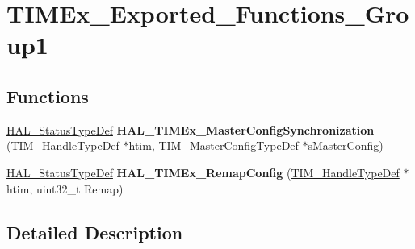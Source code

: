 \hypertarget{group___t_i_m_ex___exported___functions___group1}{\section{T\-I\-M\-Ex\-\_\-\-Exported\-\_\-\-Functions\-\_\-\-Group1}
\label{group___t_i_m_ex___exported___functions___group1}
}
\subsection*{Functions}
\begin{DoxyCompactItemize}
\item 
\hypertarget{group___t_i_m_ex___exported___functions___group1_ga056fd97d3be6c60dcfa12963f6ec8aad}{\hyperlink{stm32l1xx__hal__def_8h_a63c0679d1cb8b8c684fbb0632743478f}{H\-A\-L\-\_\-\-Status\-Type\-Def} {\bfseries H\-A\-L\-\_\-\-T\-I\-M\-Ex\-\_\-\-Master\-Config\-Synchronization} (\hyperlink{struct_t_i_m___handle_type_def}{T\-I\-M\-\_\-\-Handle\-Type\-Def} $\ast$htim, \hyperlink{struct_t_i_m___master_config_type_def}{T\-I\-M\-\_\-\-Master\-Config\-Type\-Def} $\ast$s\-Master\-Config)}\label{group___t_i_m_ex___exported___functions___group1_ga056fd97d3be6c60dcfa12963f6ec8aad}

\item 
\hypertarget{group___t_i_m_ex___exported___functions___group1_ga683118282daf3aa2e319eb8eea93af31}{\hyperlink{stm32l1xx__hal__def_8h_a63c0679d1cb8b8c684fbb0632743478f}{H\-A\-L\-\_\-\-Status\-Type\-Def} {\bfseries H\-A\-L\-\_\-\-T\-I\-M\-Ex\-\_\-\-Remap\-Config} (\hyperlink{struct_t_i_m___handle_type_def}{T\-I\-M\-\_\-\-Handle\-Type\-Def} $\ast$htim, uint32\-\_\-t Remap)}\label{group___t_i_m_ex___exported___functions___group1_ga683118282daf3aa2e319eb8eea93af31}

\end{DoxyCompactItemize}


\subsection{Detailed Description}

